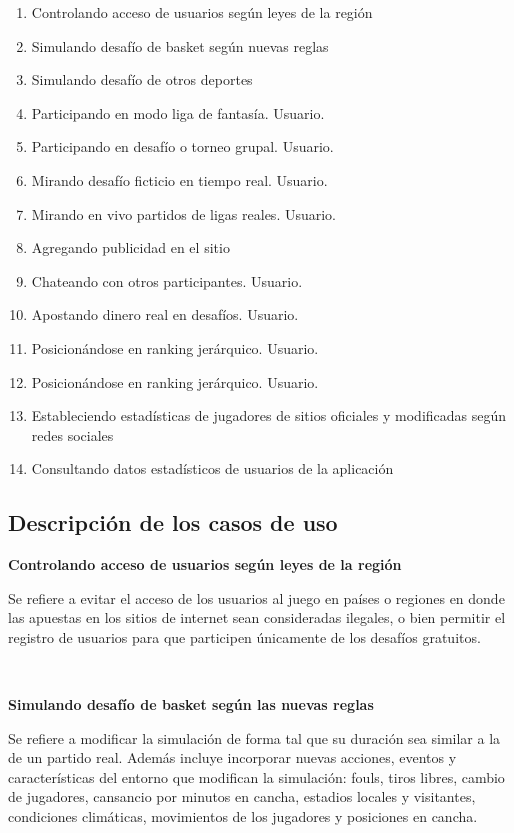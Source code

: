 \begin{enumerate}
  \item Controlando acceso de usuarios según leyes de la región
  \item Simulando desafío de basket según nuevas reglas
  \item Simulando desafío de otros deportes
  \item Participando en modo liga de fantasía. Usuario. 
  \item Participando en desafío o torneo grupal. Usuario.
  \item Mirando desafío ficticio en tiempo real. Usuario.
  \item Mirando en vivo partidos de ligas reales. Usuario.
  \item Agregando publicidad en el sitio
  \item Chateando con otros participantes. Usuario.
  \item Apostando dinero real en desafíos. Usuario.
  \item Posicionándose en ranking jerárquico. Usuario.
  \item Posicionándose en ranking jerárquico. Usuario.
  \item Estableciendo estadísticas de jugadores de sitios oficiales y modificadas según redes sociales
  \item Consultando datos estadísticos de usuarios de la aplicación
\end{enumerate}

\subsection{Descripción de los casos de uso}

\textbf{Controlando acceso de usuarios según leyes de la región}

Se refiere a evitar el acceso de los usuarios al juego en países o regiones en donde las apuestas en los sitios de internet sean consideradas
ilegales, o bien permitir el registro de usuarios para que participen únicamente de los desafíos gratuitos.

~

\textbf{Simulando desafío de basket según las nuevas reglas}

Se refiere a modificar la simulación de forma tal que su duración sea similar a la de un partido real. Además incluye incorporar 
nuevas acciones, eventos y características del entorno que modifican la simulación: fouls, tiros libres, cambio de jugadores, cansancio
por minutos en cancha, estadios locales y visitantes, condiciones climáticas, movimientos de los jugadores y posiciones en cancha.

